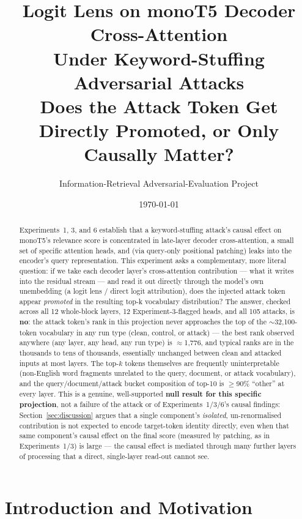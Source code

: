 \documentclass[11pt]{article}
\title{\textbf{Logit Lens on monoT5 Decoder Cross-Attention \\[2pt]
Under Keyword-Stuffing Adversarial Attacks} \\[6pt]
\large Does the Attack Token Get Directly Promoted, or Only Causally Matter?}
\author{Information-Retrieval Adversarial-Evaluation Project}
\date{\today}
\begin{document}
\maketitle

\begin{abstract}
Experiments~1, 3, and 6 establish that a keyword-stuffing attack's causal
effect on monoT5's relevance score is concentrated in late-layer decoder
cross-attention, a small set of specific attention heads, and (via
query-only positional patching) leaks into the encoder's query
representation. This experiment asks a complementary, more literal
question: if we take each decoder layer's cross-attention contribution —
what it writes into the residual stream — and read it out directly through
the model's own unembedding (a logit lens / direct logit attribution), does
the injected attack token appear \emph{promoted} in the resulting top-k
vocabulary distribution? The answer, checked across all 12 whole-block
layers, 12 Experiment-3-flagged heads, and all 105 attacks, is
\textbf{no}: the attack token's rank in this projection never approaches
the top of the $\sim$32{,}100-token vocabulary in any run type (clean,
control, or attack) — the best rank observed anywhere (any layer, any head,
any run type) is $\approx$1{,}776, and typical ranks are in the
thousands to tens of thousands, essentially unchanged between clean and
attacked inputs at most layers. The top-$k$ tokens themselves are
frequently uninterpretable (non-English word fragments unrelated to the
query, document, or attack vocabulary), and the query/document/attack
bucket composition of top-10 is $\geq$90\% ``other'' at every layer. This
is a genuine, well-supported \textbf{null result for this specific
projection}, not a failure of the attack or of Experiments~1/3/6's causal
findings: Section~\ref{sec:discussion} argues that a single component's
\emph{isolated}, un-renormalised contribution is not expected to encode
target-token identity directly, even when that same component's causal
effect on the final score (measured by patching, as in Experiments~1/3) is
large — the causal effect is mediated through many further layers of
processing that a direct, single-layer read-out cannot see.
\end{abstract}

\tableofcontents
\newpage

\section{Introduction and Motivation}
\end{document}
